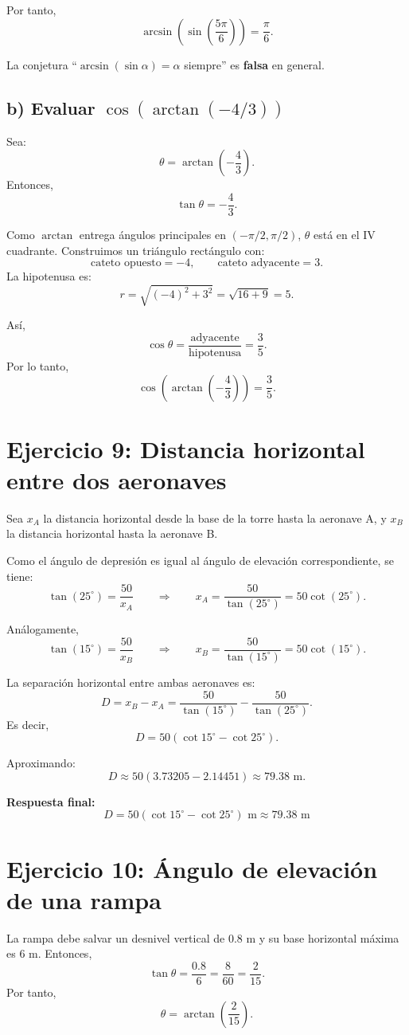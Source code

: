 \documentclass[12pt]{article}
\begin{document}
	Por tanto,
	\[
	\arcsin\left(\sin\left(\frac{5\pi}{6}\right)\right)=\frac\pi6.
	\]
	
	La conjetura ``\(\arcsin(\sin\alpha)=\alpha\) siempre'' es \textbf{falsa} en general.
	
	\subsection*{b) Evaluar \(\cos(\arctan(-4/3))\)}
	Sea:
	\[
	\theta=\arctan\left(-\frac43\right).
	\]
	Entonces,
	\[
	\tan\theta=-\frac43.
	\]
	
	Como \(\arctan\) entrega ángulos principales en \((-\pi/2,\pi/2)\), \(\theta\) está en el IV cuadrante. Construimos un triángulo rectángulo con:
	\[
	\text{cateto opuesto}=-4, \qquad \text{cateto adyacente}=3.
	\]
	La hipotenusa es:
	\[
	r=\sqrt{(-4)^2+3^2}=\sqrt{16+9}=5.
	\]
	
	Así,
	\[
	\cos\theta=\frac{\text{adyacente}}{\text{hipotenusa}}=\frac35.
	\]
	Por lo tanto,
	\[
	\boxed{\cos\left(\arctan\left(-\frac43\right)\right)=\frac35.}
	\]
	
	\section*{Ejercicio 9: Distancia horizontal entre dos aeronaves}
	Sea \(x_A\) la distancia horizontal desde la base de la torre hasta la aeronave A, y \(x_B\) la distancia horizontal hasta la aeronave B.
	
	Como el ángulo de depresión es igual al ángulo de elevación correspondiente, se tiene:
	\[
	\tan(25^\circ)=\frac{50}{x_A}
	\qquad\Rightarrow\qquad
	x_A=\frac{50}{\tan(25^\circ)}=50\cot(25^\circ).
	\]
	
	Análogamente,
	\[
	\tan(15^\circ)=\frac{50}{x_B}
	\qquad\Rightarrow\qquad
	x_B=\frac{50}{\tan(15^\circ)}=50\cot(15^\circ).
	\]
	
	La separación horizontal entre ambas aeronaves es:
	\[
	D=x_B-x_A=\frac{50}{\tan(15^\circ)}-\frac{50}{\tan(25^\circ)}.
	\]
	Es decir,
	\[
	\boxed{D=50\left(\cot 15^\circ-\cot 25^\circ\right)}.
	\]
	
	Aproximando:
	\[
	D\approx 50(3.73205-2.14451)\approx 79.38\text{ m}.
	\]
	
	\textbf{Respuesta final:}
	\[
	\boxed{D=50\left(\cot 15^\circ-\cot 25^\circ\right)\text{ m}\approx 79.38\text{ m}}
	\]
	
	\section*{Ejercicio 10: Ángulo de elevación de una rampa}
	La rampa debe salvar un desnivel vertical de \(0.8\) m y su base horizontal máxima es \(6\) m. Entonces,
	\[
	\tan\theta=\frac{0.8}{6}=\frac{8}{60}=\frac{2}{15}.
	\]
	Por tanto,
	\[
	\theta=\arctan\left(\frac{2}{15}\right).
	\]
	
\end{document}
